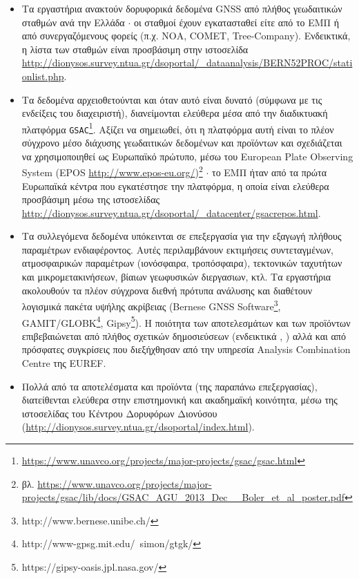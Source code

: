 \documentclass[11pt]{article}
\begin{document}
\begin{itemize}
\item Τα εργαστήρια ανακτούν δορυφορικά δεδομένα GNSS από πλήθος γεωδαιτικών σταθμών ανά την Ελλάδα $\cdot$ οι σταθμοί έχουν
εγκατασταθεί είτε από το ΕΜΠ ή από συνεργαζόμενους φορείς (π.χ. ΝΟΑ, COMET, Tree-Company). Ενδεικτικά, η λίστα των σταθμών είναι προσβάσιμη στην ιστοσελίδα \url{http://dionysos.survey.ntua.gr/dsoportal/_dataanalysis/BERN52PROC/stationlist.php}.

\item Τα δεδομένα αρχειοθετούνται και όταν αυτό είναι δυνατό (σύμφωνα με τις ενδείξεις του διαχειριστή), διανείμονται ελεύθερα μέσα από την διαδικτυακή πλατφόρμα \texttt{GSAC}\footnote{\url{https://www.unavco.org/projects/major-projects/gsac/gsac.html}}. Αξίζει να σημειωθεί, ότι η πλατφόρμα αυτή είναι το πλέον σύγχρονο μέσο διάχυσης γεωδαιτικών δεδομένων και προϊόντων και σχεδιάζεται να χρησιμοποιηθεί ως Ευρωπαϊκό πρώτυπο, μέσω του European Plate Observing System (EPOS \url{http://www.epos-eu.org/})\footnote{βλ. \url{https://www.unavco.org/projects/major-projects/gsac/lib/docs/GSAC_AGU_2013_Dec__Boler_et_al_poster.pdf}} $\cdot$ το ΕΜΠ ήταν από τα πρώτα Ευρωπαϊκά κέντρα που εγκατέστησε την πλατφόρμα, η οποία είναι ελεύθερα προσβάσιμη μέσω της ιστοσελίδας \url{http://dionysos.survey.ntua.gr/dsoportal/_datacenter/gsacrepos.html}.

\item Τα συλλεγόμενα δεδομένα υπόκεινται σε επεξεργασία για την εξαγωγή πλήθους παραμέτρων ενδιαφέροντος. Αυτές περιλαμβάνουν εκτιμήσεις συντεταγμένων, ατμοσφαιρικών παραμέτρων (ιονόσφαιρα, τροπόσφαιρα), τεκτονικών ταχυτήτων και μικρομετακινήσεων, βίαιων γεωφυσικών διεργασιων, κτλ. Τα εργαστήρια ακολουθούν τα πλέον σύγχρονα διεθνή πρότυπα ανάλυσης και διαθέτουν λογισμικά πακέτα υψήλης ακρίβειας (Bernese GNSS Software\footnote{http://www.bernese.unibe.ch/}, GAMIT/GLOBK\footnote{http://www-gpsg.mit.edu/~simon/gtgk/}, Gipsy\footnote{https://gipsy-oasis.jpl.nasa.gov/}). Η ποιότητα των αποτελεσμάτων και των προϊόντων επιβεβαιώνεται από πλήθος σχετικών δημοσιεύσεων (ενδεικτικά \cite{anastacep}, \cite{GRL50066}) αλλά και από πρόσφατες συγκρίσεις που διεξήχθησαν από την υπηρεσία Analysis Combination Centre της EUREF.

\item Πολλά από τα αποτελέσματα και προϊόντα (της παραπάνω επεξεργασίας), διατείθενται ελεύθερα στην επιστημονική και ακαδημαϊκή κοινότητα, μέσω της ιστοσελίδας του Κέντρου Δορυφόρων Διονύσου (\url{http://dionysos.survey.ntua.gr/dsoportal/index.html}).
\end{itemize}
\end{document}

